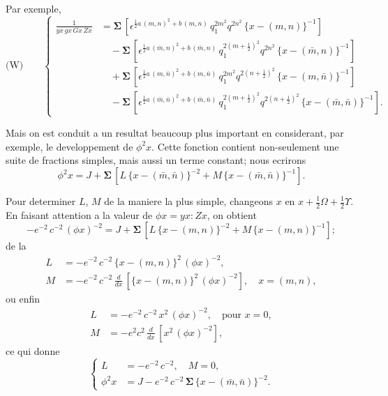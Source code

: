 \documentclass[11pt,a4paper]{book}
\begin{document}
Par exemple,
\begin{equation*}
\text{(W)}\qquad
\left\{
\begin{aligned}
\frac{1}{yx\, gx\, Gx\, Zx} &= \boldsymbol{\Sigma}\, [\epsilon^{\frac{1}{2}a\, (m, n)^2+b\, (m, n)}\, q_1^{2m^2} q^{2n^2}\, \{x - (m, n)\}^{-1}]\\
&\quad - \boldsymbol{\Sigma}\, [\epsilon^{\frac{1}{2}a\, (\bar{m}, n)^2+b\, (\bar{m}, n)}\, q_1^{2(m+\frac{1}{2})^2} q^{2n^2}\, \{x - (\bar{m}, n)\}^{-1}]\\
&\quad + \boldsymbol{\Sigma}\, [\epsilon^{\frac{1}{2}a\, (m, \bar{n})^2+b\, (m, \bar{n})}\, q_1^{2m^2} q^{2(n+\frac{1}{2})^2}\, \{x - (m, \bar{n})\}^{-1}]\\
&\quad - \boldsymbol{\Sigma}\, [\epsilon^{\frac{1}{2}a\, (\bar{m}, \bar{n})^2+b\, (\bar{m}, \bar{n})}\, q_1^{2(m+\frac{1}{2})^2} q^{2(n+\frac{1}{2})^2}\, \{x - (\bar{m}, \bar{n})\}^{-1}].
\end{aligned}
\right.
\end{equation*}

Mais on est conduit a un resultat beaucoup plus important en considerant, par
exemple, le developpement de $\phi^2 x$. Cette fonction contient non-seulement une suite
de fractions simples, mais aussi un terme constant; nous ecrirons
\begin{equation}
\phi^2 x = J + \boldsymbol{\Sigma}\, [L\, \{x - (\bar{m}, \bar{n})\}^{-2} + M\, \{x - (\bar{m}, \bar{n})\}^{-1}]. \tag{39}
\end{equation}

Pour determiner $L$, $M$ de la maniere la plus simple, changeons $x$ en $x + \frac{1}{2}\Omega + \frac{1}{2}\Upsilon$. En
faisant attention a la valeur de $\phi x = yx : Zx$, on obtient
\[-e^{-2}\, c^{-2}\, (\phi x)^{-2} = J + \boldsymbol{\Sigma}\, [L\, \{x - (m, n)\}^{-2} + M\, \{x - (m, n)\}^{-1}];\]
de la
\begin{align*}
L &= -e^{-2}\, c^{-2}\, \{x - (m, n)\}^2\, (\phi x)^{-2},\\
M &= -e^{-2}\, c^{-2}\, \frac{d}{dx}\, [\{x - (m, n)\}^2\, (\phi x)^{-2}],\quad x = (m, n),
\end{align*}
ou enfin
\begin{align*}
L &= -e^{-2}\, c^{-2}\, x^2\, (\phi x)^{-2},\quad \text{pour } x = 0,\\
M &= -e^{2} c^{2}\, \frac{d}{dx}\, [x^2\, (\phi x)^{-2}],
\end{align*}
ce qui donne
\begin{equation}
\left\{
\begin{aligned}
L &= -e^{-2}\, c^{-2},\quad M = 0,\\
\phi^2 x &= J - e^{-2}\, c^{-2}\, \boldsymbol{\Sigma}\, \{x - (\bar{m}, \bar{n})\}^{-2}.
\end{aligned}
\right. \tag{40}
\end{equation}
\end{document}
